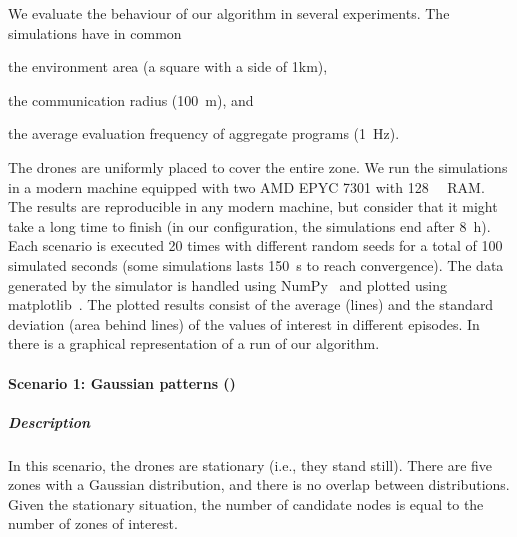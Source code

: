 We evaluate the behaviour of our algorithm in several experiments. %
 The simulations have in common
 \begin{enumerate*}%
  \item the environment area (a square with a side of 1km),
  \item the communication radius (\SI{100}{\metre}), and
  \item the average evaluation frequency of aggregate programs (\SI{1}{\hertz}).
\end{enumerate*}
The drones are uniformly placed to cover the entire zone.
We run the simulations in a modern machine equipped with two AMD EPYC 7301 with \SI{128}{\giga\byte} RAM.
 The results are reproducible in any modern machine, but consider that it might take a long time to finish
 (in our configuration, the simulations end after \SI{8}{\hour}).
%
Each scenario is executed 20 times with different random seeds
 for a total of 100 simulated seconds (some simulations lasts \SI{150}{\second} to reach convergence).
%
The data generated by the simulator is handled using NumPy~\cite{harris2020array} and plotted using matplotlib~\cite{Hunter:2007}.
%
The plotted results consist of the average (lines)
 and the standard deviation (area behind lines)
 of the values of interest in different episodes.
%
In  there is a graphical representation of a run of our algorithm.

\paragraph{Scenario 1: Gaussian patterns ()}
\subparagraph{Description}
In this scenario, the drones are stationary (i.e., they stand still).
 There are five zones with a Gaussian distribution, and there is no overlap between distributions.
 Given the stationary situation, the number of candidate nodes is equal to the number of zones of interest.

